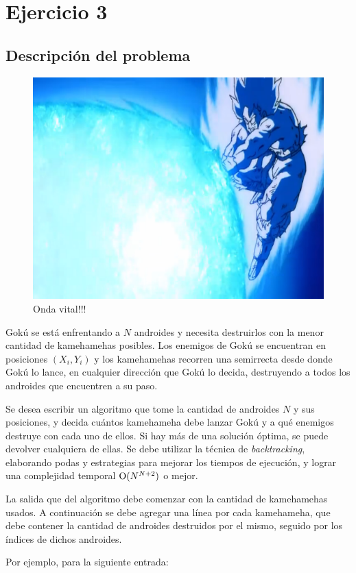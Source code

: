 \section{Ejercicio 3}
    \subsection{Descripción del problema}

		\begin{figure}[ht]
			\begin{center}
				\includegraphics[width=0.4\columnwidth]{imagenes/kamehameha.png}
				\caption{Onda vital!!!}
			\end{center}
		\end{figure}

        Gokú se está enfrentando a $N$ androides y necesita destruirlos con la menor cantidad de kamehamehas posibles. Los enemigos de Gokú se encuentran en posiciones $(X_i , Y_i)$ y los kamehamehas recorren una semirrecta desde donde Gokú lo lance, en cualquier dirección que Gokú lo decida, destruyendo a todos los androides que encuentren a su paso.

        Se desea escribir un algoritmo que tome la cantidad de androides $N$ y sus posiciones, y decida cuántos kamehameha debe lanzar Gokú y a qué enemigos destruye con cada uno de ellos. Si hay más de una solución óptima, se puede devolver cualquiera de ellas. Se debe utilizar la técnica de \emph{backtracking}, elaborando podas y estrategias para mejorar los tiempos de ejecución, y lograr una complejidad temporal $\operatorname{O}(N^{N+2})$ o mejor.

        La salida que del algoritmo debe comenzar con la cantidad de kamehamehas usados. A continuación se debe agregar una línea por cada kamehameha, que debe contener la cantidad de androides destruidos por el mismo, seguido por los índices de dichos androides.

        Por ejemplo, para la siguiente entrada:
        
